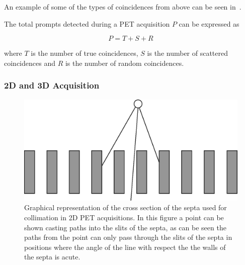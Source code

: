             An example of some of the types of coincidences from above can be seen in~.
            
            The total prompts detected during a \gls{PET} acquisition $P$ can be expressed as
            
            \begin{equation}
                P = T + S + R
            \end{equation}
            
            \noindent where $T$ is the number of true coincidences, $S$ is the number of scattered coincidences and $R$ is the number of random coincidences. %
            
            \subsubsection{2D and 3D Acquisition} \label{sec:2d_and_3d_acquisition}
                \begin{figure}
                    \centering
                    
                    \includegraphics[width=1.0\linewidth]{figures/background_septa.png}
                    
                    \captionsetup{singlelinecheck=false, justification=raggedright}
                    \caption{Graphical representation of the cross section of the septa used for collimation in \gls{2D} \gls{PET} acquisitions. In this figure a point can be shown casting paths into the slits of the septa, as can be seen the paths from the point can only pass through the slits of the septa in positions where the angle of the line with respect the the walls of the septa is acute.} \label{fig:2d_and_3d_acquisition_septa}
                \end{figure}
                
